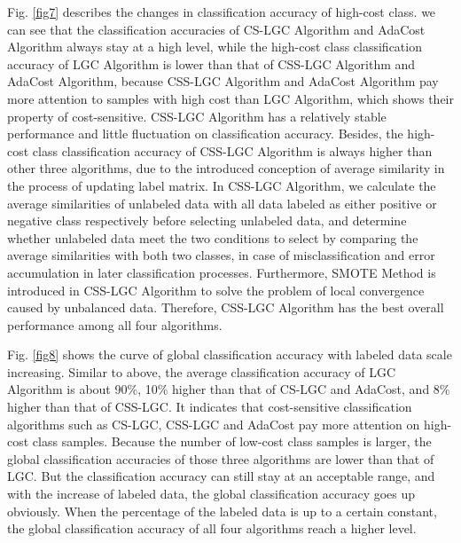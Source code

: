 \documentclass{svjour3}                     %
\begin{document}

Fig. \ref{fig7} describes the changes in classification accuracy of high-cost class. we can see that the classification accuracies of CS-LGC Algorithm and AdaCost Algorithm always stay at a high level, while the high-cost class classification accuracy of LGC Algorithm is lower than that of CSS-LGC Algorithm and AdaCost Algorithm, because CSS-LGC Algorithm and AdaCost Algorithm pay more attention to samples with high cost than LGC Algorithm, which shows their property of cost-sensitive. CSS-LGC Algorithm has a relatively stable performance and little fluctuation on classification accuracy. Besides, the high-cost class classification accuracy of CSS-LGC Algorithm is always higher than other three algorithms, due to the introduced conception of average similarity in the process of updating label matrix. In CSS-LGC Algorithm, we calculate the average similarities of unlabeled data with all data labeled as either positive or negative class respectively before selecting unlabeled data, and determine whether unlabeled data meet the two conditions to select by comparing the average similarities with both two classes, in case of misclassification and error accumulation in later classification processes. Furthermore, SMOTE Method is introduced in CSS-LGC Algorithm to solve the problem of local convergence caused by unbalanced data. Therefore, CSS-LGC Algorithm has the best overall performance among all four algorithms.

Fig. \ref{fig8} shows the curve of global classification accuracy with labeled data scale increasing. Similar to above, the average classification accuracy of LGC Algorithm is about 90\%, 10\% higher than that of CS-LGC and AdaCost, and 8\% higher than that of CSS-LGC. It indicates that cost-sensitive classification algorithms such as CS-LGC, CSS-LGC and AdaCost pay more attention on high-cost class samples. Because the number of low-cost class samples is larger, the global classification accuracies of those three algorithms are lower than that of LGC. But the classification accuracy can still stay at an acceptable range, and with the increase of labeled data, the global classification accuracy goes up obviously.  When the percentage of the labeled data is up to a certain constant, the global classification accuracy of all four algorithms reach a higher level. %
\end{document}
